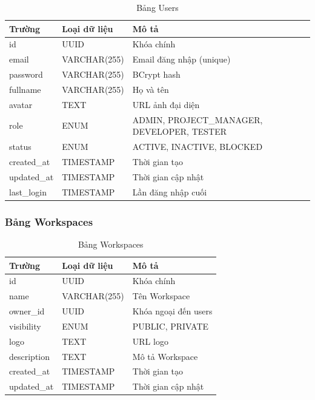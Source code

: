 \documentclass[12pt,a4paper]{report}
\begin{document}
\begin{table}[H]
\centering
\caption{Bảng Users}
\begin{tabular}{|p{4cm}|p{3.5cm}|p{6cm}|}
\hline
\textbf{Trường} & \textbf{Loại dữ liệu} & \textbf{Mô tả} \\
\hline
id & UUID & Khóa chính \\
\hline
email & VARCHAR(255) & Email đăng nhập (unique) \\
\hline
password & VARCHAR(255) & BCrypt hash \\
\hline
fullname & VARCHAR(255) & Họ và tên \\
\hline
avatar & TEXT & URL ảnh đại diện \\
\hline
role & ENUM & ADMIN, PROJECT\_MANAGER, DEVELOPER, TESTER \\
\hline
status & ENUM & ACTIVE, INACTIVE, BLOCKED \\
\hline
created\_at & TIMESTAMP & Thời gian tạo \\
\hline
updated\_at & TIMESTAMP & Thời gian cập nhật \\
\hline
last\_login & TIMESTAMP & Lần đăng nhập cuối \\
\hline
\end{tabular}
\label{tab:users_table}
\end{table}

\subsubsection{Bảng Workspaces}

\begin{table}[H]
\centering
\caption{Bảng Workspaces}
\begin{tabular}{|p{4cm}|p{3.5cm}|p{6cm}|}
\hline
\textbf{Trường} & \textbf{Loại dữ liệu} & \textbf{Mô tả} \\
\hline
id & UUID & Khóa chính \\
\hline
name & VARCHAR(255) & Tên Workspace \\
\hline
owner\_id & UUID & Khóa ngoại đến users \\
\hline
visibility & ENUM & PUBLIC, PRIVATE \\
\hline
logo & TEXT & URL logo \\
\hline
description & TEXT & Mô tả Workspace \\
\hline
created\_at & TIMESTAMP & Thời gian tạo \\
\hline
updated\_at & TIMESTAMP & Thời gian cập nhật \\
\hline
\end{tabular}
\label{tab:workspaces_table}
\end{table}
\end{document}
